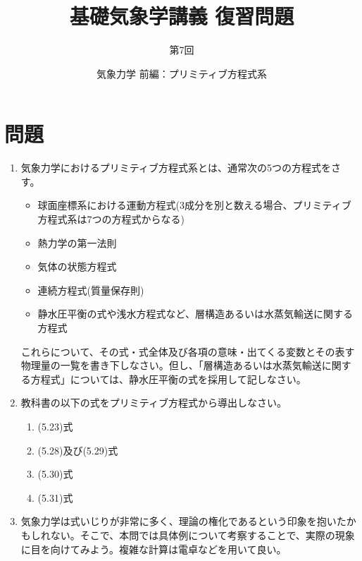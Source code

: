 \documentclass{jsarticle}
\newenvironment{problems}
{
  \renewcommand\labelenumi{\doublebox{\arabic{enumi}}}
  \begin{enumerate}
}{
  \end{enumerate}
  \renewcommand\labelenumi{\arabic{enumi}.}
}
\begin{document}
\title{基礎気象学講義 復習問題} %
\author{第7回} %
\date{気象力学 前編：プリミティブ方程式系} %
\maketitle

\section{問題}

    \begin{problems}
    \item 気象力学におけるプリミティブ方程式系とは、通常次の5つの方程式をさす。
        \begin{itemize}
        \item 球面座標系における運動方程式(3成分を別と数える場合、プリミティブ方程式系は7つの方程式からなる)
        \item 熱力学の第一法則
        \item 気体の状態方程式
        \item 連続方程式(質量保存則)
        \item 静水圧平衡の式や浅水方程式など、層構造あるいは水蒸気輸送に関する方程式
        \end{itemize}
        これらについて、その式・式全体及び各項の意味・出てくる変数とその表す物理量の一覧を書き下しなさい。但し、「層構造あるいは水蒸気輸送に関する方程式」については、静水圧平衡の式を採用して記しなさい。\\

    \item 教科書の以下の式をプリミティブ方程式から導出しなさい。
        \begin{enumerate}[(1)]
        \item (5.23)式
        \item (5.28)及び(5.29)式
        \item (5.30)式
        \item (5.31)式\\
        \end{enumerate}

    \item 気象力学は式いじりが非常に多く、理論の権化であるという印象を抱いたかもしれない。そこで、本問では具体例について考察することで、実際の現象に目を向けてみよう。複雑な計算は電卓などを用いて良い。


\end{problems}
\end{document}
